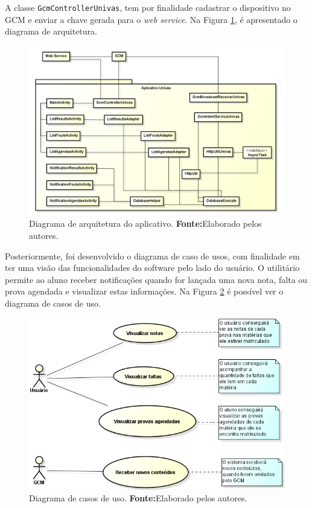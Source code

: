 	\par A classe \texttt{GcmControllerUnivas}, tem por finalidade cadastrar o
dispositivo no GCM e enviar a chave gerada para o \textit{web service}. Na
Figura \ref{fig:app}, é apresentado o diagrama de arquitetura.

	\begin{figure}[h!] 
		\centerline{\includegraphics[scale=0.4]{./imagens/2_q_metodologico/4_procedimentos_resultados/42_aplicativo/app.png}}
		\caption[Diagrama de arquitetura do aplicativo]{Diagrama de arquitetura do aplicativo.
		\textbf{Fonte:}Elaborado pelos autores.}
		\label{fig:app}
	\end{figure}
	
	\par Posteriormente, foi desenvolvido o diagrama de caso de usos, com
finalidade em ter uma visão das funcionalidades do software pelo lado do
usuário. O utilitário permite ao aluno receber notificações quando for lançada
uma nova nota, falta ou prova agendada e visualizar estas informações. Na
Figura \ref{fig:app1} é possível ver o diagrama de casos de uso.

	\begin{figure}[h!] 
		\centerline{\includegraphics[scale=0.7]{./imagens/2_q_metodologico/4_procedimentos_resultados/42_aplicativo/app1.png}}
		\caption[Diagrama de casos de uso]{Diagrama de casos de uso.
		\textbf{Fonte:}Elaborado pelos autores.}
		\label{fig:app1}
	\end{figure}
	
